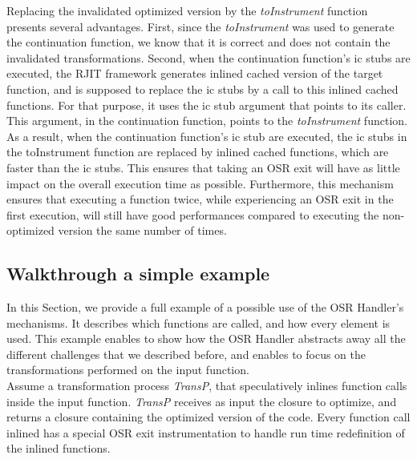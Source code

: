Replacing the invalidated optimized version by the \textit{toInstrument} function presents several advantages.
First, since the \textit{toInstrument} was used to generate the continuation function, we know that it is correct and does not contain the invalidated transformations.
Second, when the continuation function's ic stubs are executed, the RJIT framework generates inlined cached version of the target function, and is supposed to replace the ic stubs by a call to this inlined cached functions.
For that purpose, it uses the ic stub argument that points to its caller.
This argument, in the continuation function, points to the \textit{toInstrument} function.
As a result, when the continuation function's ic stub are executed, the ic stubs in the toInstrument function are replaced by inlined cached functions, which are faster than the ic stubs.
This ensures that taking an OSR exit will have as little impact on the overall execution time as possible.
Furthermore, this mechanism ensures that executing a function twice, while experiencing an OSR exit in the first execution, will still have good performances compared to executing the non-optimized version the same number of times.\\

\subsection{Walkthrough a simple example}
In this Section, we provide a full example of a possible use of the OSR Handler's mechanisms.
It describes which functions are called, and how every element is used.
This example enables to show how the OSR Handler abstracts away all the different challenges that we described before, and enables to focus on the transformations performed on the input function.\\

Assume a transformation process \textit{TransP}, that speculatively inlines function calls inside the input function. 
\textit{TransP} receives as input the closure to optimize, and returns a closure containing the optimized version of the code.
Every function call inlined has a special OSR exit instrumentation to handle run time redefinition of the inlined functions.\\

